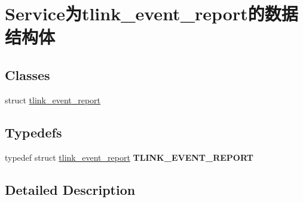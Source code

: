 \hypertarget{group__service_xE4_xB8_xBAtlink__event__report_xE7_x9A_x84_xE6_x95_xB0_xE6_x8D_xAE_xE7_xBB_x93_xE6_x9E_x84_xE4_xBD_x93}{}\section{Service为tlink\+\_\+event\+\_\+report的数据结构体}
\label{group__service_xE4_xB8_xBAtlink__event__report_xE7_x9A_x84_xE6_x95_xB0_xE6_x8D_xAE_xE7_xBB_x93_xE6_x9E_x84_xE4_xBD_x93}
\subsection*{Classes}
\begin{DoxyCompactItemize}
\item 
struct \mbox{\hyperlink{structtlink__event__report}{tlink\+\_\+event\+\_\+report}}
\end{DoxyCompactItemize}
\subsection*{Typedefs}
\begin{DoxyCompactItemize}
\item 
\mbox{\label{group__service_xE4_xB8_xBAtlink__event__report_xE7_x9A_x84_xE6_x95_xB0_xE6_x8D_xAE_xE7_xBB_x93_xE6_x9E_x84_xE4_xBD_x93_gae5498267a9b15f0e7816727f991617f6}} 
typedef struct \mbox{\hyperlink{structtlink__event__report}{tlink\+\_\+event\+\_\+report}} {\bfseries T\+L\+I\+N\+K\+\_\+\+E\+V\+E\+N\+T\+\_\+\+R\+E\+P\+O\+RT}
\end{DoxyCompactItemize}


\subsection{Detailed Description}
